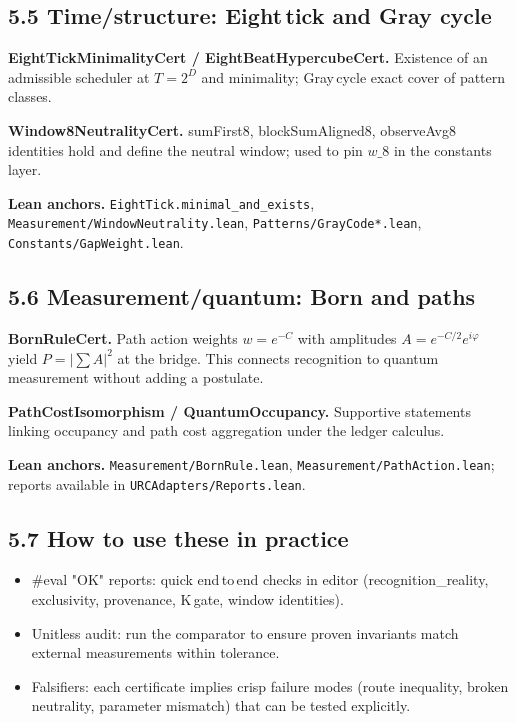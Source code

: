 \documentclass[11pt]{article}
\begin{document}
\subsection*{5.5 Time/structure: Eight\,tick and Gray cycle}
\textbf{EightTickMinimalityCert / EightBeatHypercubeCert.} Existence of an admissible scheduler at $T=2^D$ and minimality; Gray\,cycle exact cover of pattern classes.

\textbf{Window8NeutralityCert.} sumFirst8, blockSumAligned8, observeAvg8 identities hold and define the neutral window; used to pin $w\_8$ in the constants layer.

\textbf{Lean anchors.} \texttt{EightTick.minimal\_and\_exists}, \texttt{Measurement/WindowNeutrality.lean}, \texttt{Patterns/GrayCode*.lean}, \texttt{Constants/GapWeight.lean}.

\subsection*{5.6 Measurement/quantum: Born and paths}
\textbf{BornRuleCert.} Path action weights $w=e^{-C}$ with amplitudes $A=e^{-C/2}e^{i\varphi}$ yield $P=|\sum A|^2$ at the bridge. This connects recognition to quantum measurement without adding a postulate.

\textbf{PathCostIsomorphism / QuantumOccupancy.} Supportive statements linking occupancy and path cost aggregation under the ledger calculus.

\textbf{Lean anchors.} \texttt{Measurement/BornRule.lean}, \texttt{Measurement/PathAction.lean}; reports available in \texttt{URCAdapters/Reports.lean}.

\subsection*{5.7 How to use these in practice}
\begin{itemize}[leftmargin=*]
  \item \#eval "OK" reports: quick end\,to\,end checks in editor (recognition\_reality, exclusivity, provenance, K\,gate, window identities).
  \item Unitless audit: run the comparator to ensure proven invariants match external measurements within tolerance.
  \item Falsifiers: each certificate implies crisp failure modes (route inequality, broken neutrality, parameter mismatch) that can be tested explicitly.
\end{itemize}
\end{document}

